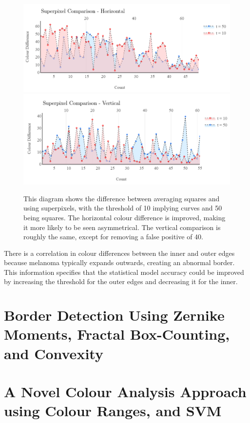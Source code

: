 \begin{figure}
\centering
\includegraphics[scale=0.7]{images/superpixel2.png}
\includegraphics[scale=0.7]{images/superpixel1.png}
\caption{This diagram shows the difference between averaging squares and using superpixels, with the threshold of 10 implying curves and 50 being squares. The horizontal colour difference is improved, making it more likely to be seen asymmetrical. The vertical comparison is roughly the same, except for removing a false positive of 40.}
\end{figure}\label{asy3}

There is a correlation in colour differences between the inner and outer edges because melanoma typically expands outwards, creating an abnormal border. This information specifies that the statistical model accuracy could be improved by increasing the threshold for the outer edges and decreasing it for the inner.

\section{Border Detection Using Zernike Moments, 
Fractal Box-Counting, and Convexity}

\section{A Novel Colour Analysis Approach using Colour Ranges, and SVM}


